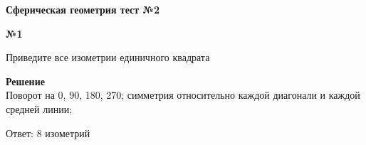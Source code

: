 


    \begin{center}
        \textbf{Сферическая геометрия тест №2}\\
    \end{center}

    \begin{center}
        \textbf{№1}
    \end{center}

    Приведите все изометрии единичного квадрата

    \textbf{Решение}\\

    Поворот на 0, 90, 180, 270; симметрия относительно каждой диагонали и каждой средней линии;

    Ответ: 8 изометрий



